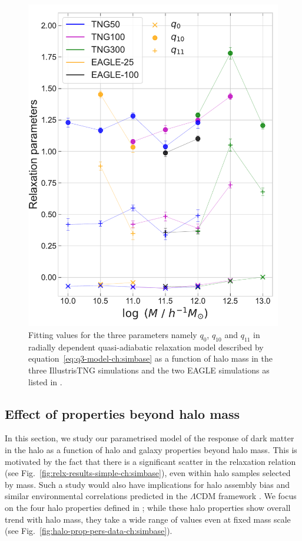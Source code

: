 \begin{figure}
    \centering
    \includegraphics[width=\linewidth]{plots/fit_param_q3s_M_TE.pdf}
    \caption{Fitting values for the three parameters namely $q_{0}$, $q_{10}$ and $q_{11}$ in radially dependent quasi-adiabatic relaxation model described by equation~\ref{eq:q3-model-ch:simbase} as a function of halo mass in the three IllustrisTNG simulations and the two EAGLE simulations as listed in .}
    \label{fig:3-param-mass-only-ch:simbase}
\end{figure}
\subsection{Effect of properties beyond halo mass}
\label{sec:dep-on-hal-gal-props-ch:simbase}
In this section, we study our parametrised model of the response of dark matter in the halo as a function of halo and galaxy properties beyond halo mass. This is motivated by the fact that there is a significant scatter in the relaxation relation (see Fig.~\ref{fig:relx-results-simple-ch:simbase}), even within halo samples selected by mass. Such a study would also have implications for halo assembly bias and similar environmental correlations predicted in the $\Lambda$CDM framework  \citep[see, e.g., the discussion in][]{2021arXiv211200026P}. We focus on the four halo properties defined in ; while these halo properties show overall trend with halo mass, they take a wide range of values even at fixed mass scale (see Fig.~\ref{fig:halo-prop-pers-data-ch:simbase}). 


